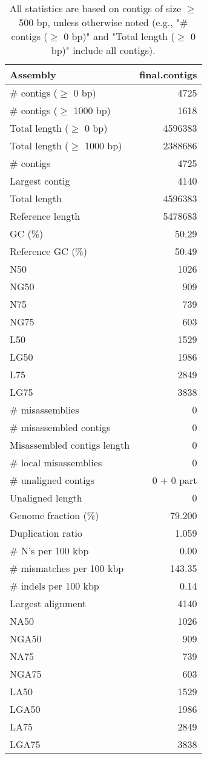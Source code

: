 \documentclass[12pt,a4paper]{article}
\begin{document}
\begin{table}[ht]
\begin{center}
\caption{All statistics are based on contigs of size $\geq$ 500 bp, unless otherwise noted (e.g., "\# contigs ($\geq$ 0 bp)" and "Total length ($\geq$ 0 bp)" include all contigs).}
\begin{tabular}{|l*{1}{|r}|}
\hline
Assembly & final.contigs \\ \hline
\# contigs ($\geq$ 0 bp) & 4725 \\ \hline
\# contigs ($\geq$ 1000 bp) & 1618 \\ \hline
Total length ($\geq$ 0 bp) & 4596383 \\ \hline
Total length ($\geq$ 1000 bp) & 2388686 \\ \hline
\# contigs & 4725 \\ \hline
Largest contig & 4140 \\ \hline
Total length & 4596383 \\ \hline
Reference length & 5478683 \\ \hline
GC (\%) & 50.29 \\ \hline
Reference GC (\%) & 50.49 \\ \hline
N50 & 1026 \\ \hline
NG50 & 909 \\ \hline
N75 & 739 \\ \hline
NG75 & 603 \\ \hline
L50 & 1529 \\ \hline
LG50 & 1986 \\ \hline
L75 & 2849 \\ \hline
LG75 & 3838 \\ \hline
\# misassemblies & 0 \\ \hline
\# misassembled contigs & 0 \\ \hline
Misassembled contigs length & 0 \\ \hline
\# local misassemblies & 0 \\ \hline
\# unaligned contigs & 0 + 0 part \\ \hline
Unaligned length & 0 \\ \hline
Genome fraction (\%) & 79.200 \\ \hline
Duplication ratio & 1.059 \\ \hline
\# N's per 100 kbp & 0.00 \\ \hline
\# mismatches per 100 kbp & 143.35 \\ \hline
\# indels per 100 kbp & 0.14 \\ \hline
Largest alignment & 4140 \\ \hline
NA50 & 1026 \\ \hline
NGA50 & 909 \\ \hline
NA75 & 739 \\ \hline
NGA75 & 603 \\ \hline
LA50 & 1529 \\ \hline
LGA50 & 1986 \\ \hline
LA75 & 2849 \\ \hline
LGA75 & 3838 \\ \hline
\end{tabular}
\end{center}
\end{table}
\end{document}
